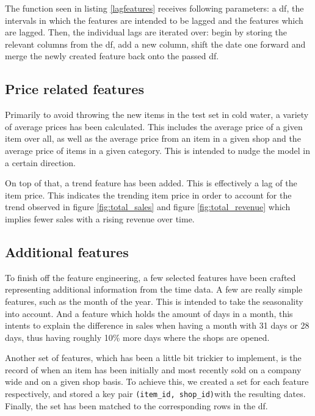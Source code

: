 

The function seen in listing \ref{lagfeatures} receives following parameters: a \gls{df}, the intervals in which the features are intended to be lagged and the features which are lagged. Then, the individual lags are iterated over: begin by storing the relevant columns from the \gls{df}, add a new column, shift the date one forward and merge the newly created feature back onto the passed \gls{df}.


\subsection{Price related features}

Primarily to avoid throwing the new items in the test set in cold water, a variety of average prices has been calculated. This includes the average price of a given item over all, as well as the average price from an item in a given shop and the average price of items in a given category.
This is intended to nudge the model in a certain direction.

On top of that, a trend feature has been added. This is effectively a lag of the item price. This indicates the trending item price in order to account for the trend observed in figure \ref{fig:total_sales} and figure \ref{fig:total_revenue} which implies fewer sales with a rising revenue over time.

\subsection{Additional features}

To finish off the feature engineering, a few selected features have been crafted representing additional information from the time data. A few are really simple features, such as the month of the year. This is intended to take the seasonality into account. And a feature which holds the amount of days in a month, this intents to explain the difference in sales when having a month with 31 days or 28 days, thus having roughly 10\% more days where the shops are opened.

Another set of features, which has been a little bit trickier to implement, is the record of when an item has been initially and most recently sold on a company wide and on a given shop basis.
To achieve this, we created a set for each feature respectively, and stored a key pair \texttt{(item\_id, shop\_id)}with the resulting dates. Finally, the set has been matched to the corresponding rows in the \gls{df}.
